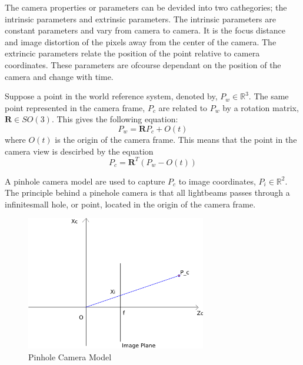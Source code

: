 	The camera properties or parameters can be devided into two cathegories; the intrinsic parameters and extrinsic 
	parameters. The intrinsic parameters are constant parameters and vary from camera to camera. It is the focus 
	distance and image distortion of the pixels away from the center of the camera. The extrincic parameters relate 
	the position of the point relative to camera coordinates. These parameters are ofcourse dependant on the 
	position of the camera and change with time. \cite{robotbok}
	
	
	Suppose a point in the world reference system, denoted by, $P_w \in \mathbb{R}^3$. The same point
	represented in the camera frame, $P_c$ are related to $P_w$ by a rotation matrix, $\mathbf{R} \in
	SO(3)$. This gives the following equation: 
	\begin{equation}
		P_w = \mathbf{R} P_c + O(t)
	\end{equation}
	where $O(t)$ is the origin of the camera frame. This means that the point in the camera view is
	descirbed by the equation
	\begin{equation}
		\label{eq:ch1-P_c}
		P_c = \mathbf{R}^T (P_w - O(t))
	\end{equation}

	A pinhole camera model are used to capture $P_c$ to image coordinates, $P_i \in
	\mathbb{R}^2$. 
	The principle behind a pinehole camera is that all lightbeams passes through a
	infinitesmall hole, or point, located in the origin of the camera frame.   
	\begin{figure}[hbtp]
		\centering
		\includegraphics[width=0.7\textwidth]{pics/pinhole_model2}
		\caption{Pinhole Camera Model}
		\label{fig:ch1-pinhole}
	\end{figure}
			
